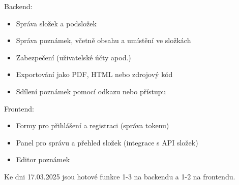 \begin{minipage}[t]{0.45\textwidth}
	\vfill
	{\large{Backend:}}

	\begin{itemize}
		\item Správa složek a podsložek
		\item Správa poznámek, včetně obsahu a umístění ve složkách
		\item Zabezpečení (uživatelské účty apod.)
		\item Exportování jako PDF, HTML nebo zdrojový kód
		\item Sdílení poznámek pomocí odkazu nebo přístupu
	\end{itemize}
	\vfill
\end{minipage}
\hfill
\begin{minipage}[t]{0.45\textwidth}
	\vfill
	{\large{Frontend:}}

	\begin{itemize}
		\item Formy pro přihlášení a registraci (správa tokenu)
		\item Panel pro správu a přehled složek (integrace s API složek)
		\item Editor poznámek
	\end{itemize}
	\vfill
\end{minipage}

Ke dni 17.03.2025 jsou hotové funkce 1-3 na backendu a 1-2 na frontendu.
